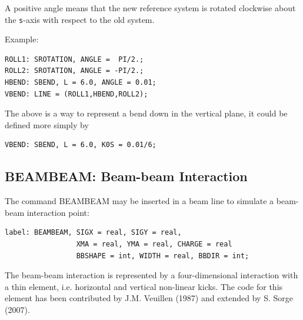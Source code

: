 A positive angle means that the new reference system is rotated
clockwise about the \texttt{s}-axis with respect to the old system.  

Example: 
\begin{verbatim}
ROLL1: SROTATION, ANGLE =  PI/2.;
ROLL2: SROTATION, ANGLE = -PI/2.;
HBEND: SBEND, L = 6.0, ANGLE = 0.01;
VBEND: LINE = (ROLL1,HBEND,ROLL2);
\end{verbatim} 
The above is a way to represent a bend down in the vertical plane, it could be defined more simply by 
\begin{verbatim}
VBEND: SBEND, L = 6.0, K0S = 0.01/6;
\end{verbatim}



%
\subsection{BEAMBEAM: Beam-beam Interaction}
The command BEAMBEAM may be inserted in a beam line to simulate a
beam-beam interaction point:  
 
\begin{verbatim}
label: BEAMBEAM, SIGX = real, SIGY = real,
                 XMA = real, YMA = real, CHARGE = real
                 BBSHAPE = int, WIDTH = real, BBDIR = int;
\end{verbatim}

The beam-beam interaction is represented by a four-dimensional
interaction with a thin element, i.e. horizontal and vertical non-linear kicks.
The code for this element has been contributed by J.M. Veuillen (1987)
and extended by S. Sorge (2007).  
 
